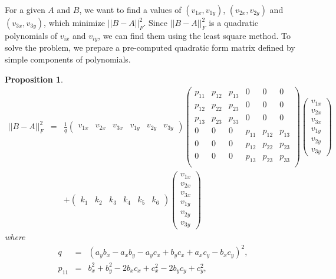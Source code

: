 \documentclass[8pt]{article}
\newtheorem{prop}{\bf Proposition}
\begin{document}
For a given $A$ and $B$,
we want to find a values of
$(v_{1x},v_{1y})$, $(v_{2x},v_{2y})$ and $(v_{3x},v_{3y})$,
which minimize $||B - A||^2_F$.
Since $||B - A||^2_F$ is a quadratic polynomials of $v_{ix}$ and
$v_{iy}$,
we can find them using the least square method.
To solve the problem, we prepare a pre-computed
quadratic form matrix defined by simple components of polynomials.
\begin{prop}\label{prop:arap}
\begin{eqnarray*}
||B - A||^2_F &=&
\frac{1}{q}
\left(
\begin{array}{cccccc}
 v_{1x} & v_{2x} & v_{3x} &  v_{1y} & v_{2y} & v_{3y}
\end{array}
\right)
\left(
\begin{array}{cccccc}
 p_{11} & p_{12} & p_{13} & 0 & 0 & 0 \\
 p_{12} & p_{22} & p_{23} & 0 & 0 & 0 \\
 p_{13} & p_{23} & p_{33} & 0 & 0 & 0 \\
 0 & 0 & 0 & p_{11} & p_{12} & p_{13} \\
 0 & 0 & 0 &p_{12} & p_{22} & p_{23} \\
 0 & 0 & 0 &p_{13} & p_{23} & p_{33} \\
\end{array}
\right)
\left(
\begin{array}{c}
 v_{1x} \\ v_{2x} \\ v_{3x}\\
 v_{1y} \\ v_{2y} \\ v_{3y}
\end{array}
\right) \\
&& +
\left(
\begin{array}{cccccc}
k_1 & k_2 & k_3 & k_4 & k_5 & k_6
\end{array}
\right)
\left(
\begin{array}{c}
 v_{1x} \\ v_{2x} \\ v_{3x}\\
 v_{1y} \\ v_{2y} \\ v_{3y}
\end{array}
 \right)
\end{eqnarray*}
where
\begin{eqnarray*}
q&=&(a_{y} b_{x}-a_{x} b_{y}-a_{y} c_{x}+b_{y} c_{x}+a_{x} c_{y}-b_{x} c_{y})^2, \\
p_{11}&=&b_{x}^2+b_{y}^2-2 b_{x} c_{x}+c_{x}^2-2 b_{y} c_{y}+c_{y}^2, \\

\end{eqnarray*}
\end{prop}
\end{document}
